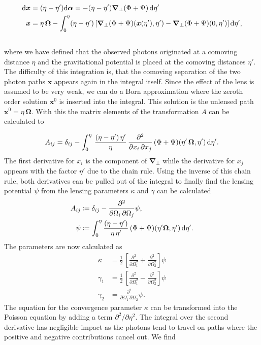 \documentclass[../main.tex]{subfiles}
\begin{document}
\begin{align}
    \mathrm{d} \boldsymbol{x} &= (\eta-\eta') \mathrm{d} \boldsymbol{\alpha} = - (\eta-\eta') \boldsymbol{\nabla}_\perp (\Phi+\Psi)\, \mathrm{d} \eta'\\
    \boldsymbol{x} &= \eta\,\boldsymbol{\Omega} - \int_0^\eta (\eta-\eta') \left[\boldsymbol{\nabla}_\perp (\Phi+\Psi)(\boldsymbol{x}(\eta'),\eta')-\boldsymbol{\nabla}_\perp (\Phi+\Psi)(0,\eta')\right] \mathrm{d} \eta',
\end{align}  \\
where we have defined that the observed photons originated at a comoving distance $\eta$ and the gravitational potential is placed at the comoving distances $\eta'$. The difficulty of this integration is, that the comoving separation of the two photon paths $\boldsymbol{x}$ appears again in the integral itself. Since the effect of the lens is assumed to be very weak, we can do a Born approximation where the zeroth order solution $\boldsymbol{x}^0$ is inserted into the integral. This solution is the unlensed path $\boldsymbol{x}^0=\eta\,\boldsymbol{\Omega}$. With this the matrix elements of the transformation $A$ can be calculated to 

\begin{equation}
    A_{ij} = \delta_{ij} - \int_0^\eta \, \frac{(\eta-\eta')\,\eta'}{\eta} \, \frac{\partial^2}{\partial x_i \, \partial x_j} \, (\Phi+\Psi)(\eta' \, \boldsymbol{\Omega},\eta')\, \mathrm{d} \eta'.
\end{equation} 
The first derivative for $x_i$ is the component of $\boldsymbol{\nabla}_\perp$ while the derivative for $x_j$ appears with the factor $\eta'$ due to the chain rule. Using the inverse of this chain rule, both derivatives can be pulled out of the integral to finally find the lensing potential $\psi$ from the lensing parameters $\kappa$ and $\gamma$ can be calculated \begin{align}
    A_{ij} &\coloneqq \delta_{ij} - \frac{\partial^2}{\partial \Omega_i \, \partial \Omega_j} \psi,\\
    \psi &\coloneqq \int_0^\eta \frac{(\eta-\eta')}{\eta\,\eta'}\, (\Phi+\Psi)(\eta' \boldsymbol{\Omega},\eta') \, \mathrm{d} \eta'.
\end{align}
The parameters are now calculated as \begin{align}
    \kappa &= \frac{1}{2} \, \left[\frac{\partial^2}{\partial \Omega_1^2}+\frac{\partial^2}{\partial \Omega_2^2}\right]  \psi \nonumber \\
    \gamma_1&= \frac{1}{2} \, \left[\frac{\partial^2}{\partial \Omega_1^2}-\frac{\partial^2}{\partial \Omega_2^2}\right]  \psi \\
    \gamma_2& = \frac{\partial^2}{\partial \Omega_1\,\partial\Omega_2} \psi .\nonumber
\end{align}
The equation for the convergence parameter $\kappa$ can be transformed into the Poisson equation by adding a term $\partial^2/\partial\eta^2$. The integral over the second derivative has negligible impact as the photons tend to travel on paths where the positive and negative contributions cancel out. We find 
\end{document}
